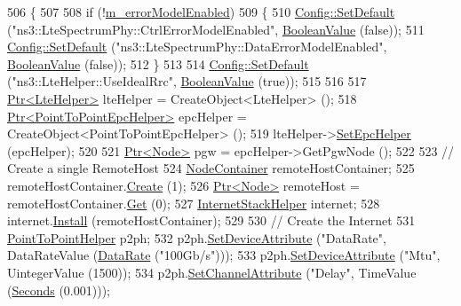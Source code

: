 \begin{DoxyCode}
506 \{
507 
508   \textcolor{keywordflow}{if} (!\hyperlink{classLenaFdTbfqFfMacSchedulerTestCase2_a086a939ce70ca29032da90ac4bf4fe5f}{m\_errorModelEnabled})
509     \{
510       \hyperlink{group__config_ga2e7882df849d8ba4aaad31c934c40c06}{Config::SetDefault} (\textcolor{stringliteral}{"ns3::LteSpectrumPhy::CtrlErrorModelEnabled"}, 
      \hyperlink{classns3_1_1BooleanValue}{BooleanValue} (\textcolor{keyword}{false}));
511       \hyperlink{group__config_ga2e7882df849d8ba4aaad31c934c40c06}{Config::SetDefault} (\textcolor{stringliteral}{"ns3::LteSpectrumPhy::DataErrorModelEnabled"}, 
      \hyperlink{classns3_1_1BooleanValue}{BooleanValue} (\textcolor{keyword}{false}));
512     \}
513 
514   \hyperlink{group__config_ga2e7882df849d8ba4aaad31c934c40c06}{Config::SetDefault} (\textcolor{stringliteral}{"ns3::LteHelper::UseIdealRrc"}, 
      \hyperlink{classns3_1_1BooleanValue}{BooleanValue} (\textcolor{keyword}{true}));
515 
516 
517   \hyperlink{classns3_1_1Ptr}{Ptr<LteHelper>} lteHelper = CreateObject<LteHelper> ();
518   \hyperlink{classns3_1_1Ptr}{Ptr<PointToPointEpcHelper>}  epcHelper = CreateObject<PointToPointEpcHelper> ();
519   lteHelper->\hyperlink{classns3_1_1LteHelper_a324079a1ccd54ce949786b83d6b95915}{SetEpcHelper} (epcHelper);
520 
521   \hyperlink{classns3_1_1Ptr}{Ptr<Node>} pgw = epcHelper->GetPgwNode ();
522 
523   \textcolor{comment}{// Create a single RemoteHost}
524   \hyperlink{classns3_1_1NodeContainer}{NodeContainer} remoteHostContainer;
525   remoteHostContainer.\hyperlink{classns3_1_1NodeContainer_a787f059e2813e8b951cc6914d11dfe69}{Create} (1);
526   \hyperlink{classns3_1_1Ptr}{Ptr<Node>} remoteHost = remoteHostContainer.\hyperlink{classns3_1_1NodeContainer_a9ed96e2ecc22e0f5a3d4842eb9bf90bf}{Get} (0);
527   \hyperlink{classns3_1_1InternetStackHelper}{InternetStackHelper} internet;
528   internet.\hyperlink{classns3_1_1InternetStackHelper_a6645b412f31283d2d9bc3d8a95cebbc0}{Install} (remoteHostContainer);
529 
530   \textcolor{comment}{// Create the Internet}
531   \hyperlink{classns3_1_1PointToPointHelper}{PointToPointHelper} p2ph;
532   p2ph.\hyperlink{classns3_1_1PointToPointHelper_a4577f5ab8c387e5528af2e0fbab1152e}{SetDeviceAttribute} (\textcolor{stringliteral}{"DataRate"}, DataRateValue (\hyperlink{classns3_1_1DataRate}{DataRate} (\textcolor{stringliteral}{"100Gb/s"})));
533   p2ph.\hyperlink{classns3_1_1PointToPointHelper_a4577f5ab8c387e5528af2e0fbab1152e}{SetDeviceAttribute} (\textcolor{stringliteral}{"Mtu"}, UintegerValue (1500));
534   p2ph.\hyperlink{classns3_1_1PointToPointHelper_a6b5317fd17fb61e5a53f8d66a90b63b9}{SetChannelAttribute} (\textcolor{stringliteral}{"Delay"}, TimeValue (\hyperlink{group__timecivil_ga33c34b816f8ff6628e33d5c8e9713b9e}{Seconds} (0.001)));

\end{DoxyCode}
